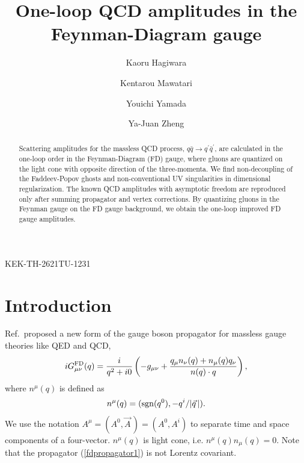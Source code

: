 \documentclass[preprint,amsmath,amssymb,superscriptaddress, floatfix,nofootinbib]{revtex4}
\begin{document}
\begin{flushright}
KEK-TH-2621\quad\quad   TU-1231 
\end{flushright}


\title{One-loop QCD amplitudes in the Feynman-Diagram gauge }
%
%
\author{Kaoru Hagiwara}
\address{KEK Theory Center and Sokendai, Tsukuba, Ibaraki 305-0801, Japan}
%
%
\author{Kentarou Mawatari }
\address{Faculty of Education,  Iwate University, Morioka, Iwate 020-8550, Japan}
\address{Graduate School of Arts and Sciences, Graduate School of Science and Engineering, 
Iwate University, Morioka, Iwate 020-8550, Japan}
%
%
\author{Youichi Yamada}
\address{Department of Physics, Tohoku University, Sendai 980-8578, Japan}
\author{Ya-Juan Zheng}
\address{Faculty of Education, Iwate University, Morioka, Iwate 020-8550, Japan}

\begin{abstract}
Scattering amplitudes for the massless QCD process, 
$q\bar{q}\to q^\prime\bar{q}^\prime$, are calculated 
in the one-loop order in the Feynman-Diagram (FD) gauge, 
where gluons are quantized on the light cone 
with opposite direction of the three-momenta. 
We find non-decoupling of the Faddeev-Popov ghosts 
and non-conventional UV singularities in dimensional regularization. 
The known QCD amplitudes with asymptotic freedom are 
reproduced only after summing propagator and vertex corrections. 
By quantizing gluons in the Feynman gauge on the FD gauge background, 
we obtain the one-loop improved FD gauge amplitudes.
\end{abstract} 
%
\maketitle



\section{Introduction}
\label{sec:intro}

Ref.\,\cite{Hagiwara:2020tbx} proposed a new form of the 
gauge boson propagator for massless gauge theories like QED and QCD, 
%
\begin{equation}
iG^{\rm FD}_{\mu\nu}(q) = \frac{i}{q^2+i0} \left( -g_{\mu\nu} 
+ \frac{q_{\mu}n_{\nu}(q)+n_{\mu}(q)q_{\nu}  }{n(q)\cdot q }  \right) , 
\label{fdpropagator1}
\end{equation}
where $n^{\mu}(q)$ is defined as 
%
\begin{equation}
n^{\mu}(q) = ({\rm sgn}(q^0), -q^i/|\vec{q}\,|) .
\label{FDlightcone}
\end{equation}
%
We use the notation 
$A^{\mu}=(A^0,\vec{A}\,)=(A^0,{A}^i)$ to separate 
time and space components of a four-vector. 
$n^{\mu}(q)$ is light cone, i.e. $n^{\mu}(q)n_{\mu}(q)=0$. 
Note that the propagator (\ref{fdpropagator1}) is not Lorentz covariant. 
\end{document}
